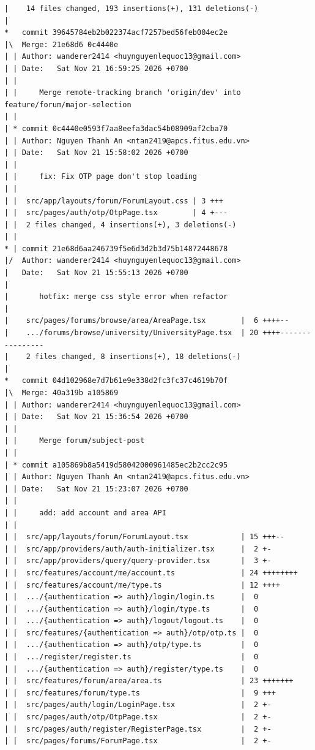 \documentclass[12pt]{article}
\begin{document}
\begin{lstlisting}[numbers=none,breaklines=true]
|    14 files changed, 193 insertions(+), 131 deletions(-)
|
*   commit 39645784eb2b022374acf7257bed56feb004ec2e
|\  Merge: 21e68d6 0c4440e
| | Author: wanderer2414 <huynguyenlequoc13@gmail.com>
| | Date:   Sat Nov 21 16:59:25 2026 +0700
| |
| |     Merge remote-tracking branch 'origin/dev' into feature/forum/major-selection
| |
| * commit 0c4440e0593f7aa8eefa3dac54b08909af2cba70
| | Author: Nguyen Thanh An <ntan2419@apcs.fitus.edu.vn>
| | Date:   Sat Nov 21 15:58:02 2026 +0700
| |
| |     fix: Fix OTP page don't stop loading
| |
| |  src/app/layouts/forum/ForumLayout.css | 3 +++
| |  src/pages/auth/otp/OtpPage.tsx        | 4 +---
| |  2 files changed, 4 insertions(+), 3 deletions(-)
| |
* | commit 21e68d6aa246739f5e6d3d2b3d75b14872448678
|/  Author: wanderer2414 <huynguyenlequoc13@gmail.com>
|   Date:   Sat Nov 21 15:55:13 2026 +0700
|
|       hotfix: merge css style error when refactor
|
|    src/pages/forums/browse/area/AreaPage.tsx        |  6 ++++--
|    .../forums/browse/university/UniversityPage.tsx  | 20 ++++----------------
|    2 files changed, 8 insertions(+), 18 deletions(-)
|
*   commit 04d102968e7d7b61e9e338d2fc3fc37c4619b70f
|\  Merge: 40a319b a105869
| | Author: wanderer2414 <huynguyenlequoc13@gmail.com>
| | Date:   Sat Nov 21 15:36:54 2026 +0700
| |
| |     Merge forum/subject-post
| |
| * commit a105869b8a5419d58042000961485ec2b2cc2c95
| | Author: Nguyen Thanh An <ntan2419@apcs.fitus.edu.vn>
| | Date:   Sat Nov 21 15:23:07 2026 +0700
| |
| |     add: add account and area API
| |
| |  src/app/layouts/forum/ForumLayout.tsx            | 15 +++--
| |  src/app/providers/auth/auth-initializer.tsx      |  2 +-
| |  src/app/providers/query/query-provider.tsx       |  3 +-
| |  src/features/account/me/account.ts               | 24 ++++++++
| |  src/features/account/me/type.ts                  | 12 ++++
| |  .../{authentication => auth}/login/login.ts      |  0
| |  .../{authentication => auth}/login/type.ts       |  0
| |  .../{authentication => auth}/logout/logout.ts    |  0
| |  src/features/{authentication => auth}/otp/otp.ts |  0
| |  .../{authentication => auth}/otp/type.ts         |  0
| |  .../register/register.ts                         |  0
| |  .../{authentication => auth}/register/type.ts    |  0
| |  src/features/forum/area/area.ts                  | 23 +++++++
| |  src/features/forum/type.ts                       |  9 +++
| |  src/pages/auth/login/LoginPage.tsx               |  2 +-
| |  src/pages/auth/otp/OtpPage.tsx                   |  2 +-
| |  src/pages/auth/register/RegisterPage.tsx         |  2 +-
| |  src/pages/forums/ForumPage.tsx                   |  2 +-

\end{lstlisting}
\end{document}
